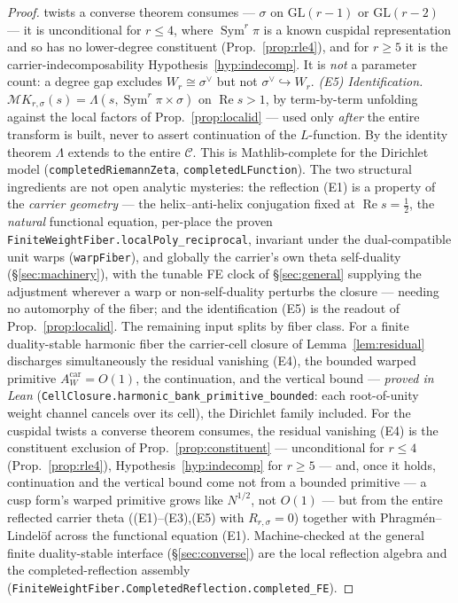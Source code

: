 \documentclass[11pt]{article}
\theoremstyle{definition}
\renewcommand{\Re}{\operatorname{Re}}
\newcommand{\Sym}{\operatorname{Sym}}
\begin{document}
\begin{proof}
twists a converse theorem consumes --- $\sigma$ on $\mathrm{GL}(r-1)$ or $\mathrm{GL}(r-2)$ --- it is
unconditional for $r\le4$, where $\Sym^r\pi$ is a known cuspidal representation and so has no lower-degree
constituent (Prop.~\ref{prop:rle4}), and for $r\ge5$ it is the carrier-indecomposability
Hypothesis~\ref{hyp:indecomp}. It is \emph{not} a parameter count: a degree gap excludes $W_r\cong\sigma^\vee$
but not $\sigma^\vee\hookrightarrow W_r$.
\emph{(E5) Identification.} $\mathcal M K_{r,\sigma}(s)=\Lambda(s,\Sym^r\pi\times\sigma)$ on $\Re s>1$, by
term-by-term unfolding against the local factors of Prop.~\ref{prop:localid} --- used only \emph{after} the
entire transform is built, never to assert continuation of the $L$-function. By the identity theorem
$\Lambda$ extends to the entire $\mathcal C$. This is Mathlib-complete for the Dirichlet model
(\texttt{completedRiemannZeta}, \texttt{completedLFunction}). The two structural ingredients are not open
analytic mysteries: the reflection \textup{(E1)} is a property of the \emph{carrier geometry} --- the
helix--anti-helix conjugation fixed at $\Re s=\tfrac12$, the \emph{natural} functional equation, per-place
the proven \texttt{FiniteWeightFiber.localPoly\_reciprocal}, invariant under the dual-compatible unit warps
(\texttt{warpFiber}), and globally the carrier's own theta self-duality (\S\ref{sec:machinery}), with the
tunable FE clock of \S\ref{sec:general} supplying the adjustment wherever a warp or non-self-duality
perturbs the closure --- needing no automorphy of the fiber; and the identification \textup{(E5)} is the
readout of Prop.~\ref{prop:localid}. The remaining input splits by fiber class. For a finite duality-stable
harmonic fiber the carrier-cell closure of Lemma~\ref{lem:residual} discharges simultaneously the residual
vanishing \textup{(E4)}, the bounded warped primitive $A^{\mathrm{car}}_W=O(1)$, the continuation, and the
vertical bound --- \emph{proved in Lean} (\texttt{CellClosure.harmonic\_bank\_primitive\_bounded}: each
root-of-unity weight channel cancels over its cell), the Dirichlet family included. For the cuspidal twists a
converse theorem consumes, the residual vanishing \textup{(E4)} is the constituent exclusion of
Prop.~\ref{prop:constituent} --- unconditional for $r\le4$ (Prop.~\ref{prop:rle4}), Hypothesis~\ref{hyp:indecomp}
for $r\ge5$ --- and, once it holds, continuation and the vertical bound come not from a bounded primitive ---
a cusp form's warped primitive grows like $N^{1/2}$, not $O(1)$ --- but from the entire reflected carrier theta
(\textup{(E1)--(E3),(E5)} with $R_{r,\sigma}=0$) together with Phragm\'en--Lindel\"of across the functional
equation \textup{(E1)}. Machine-checked at the general finite
duality-stable interface (\S\ref{sec:converse}) are the local reflection algebra and the
completed-reflection assembly (\texttt{FiniteWeightFiber.CompletedReflection.completed\_FE}).
\end{proof}
\end{document}
